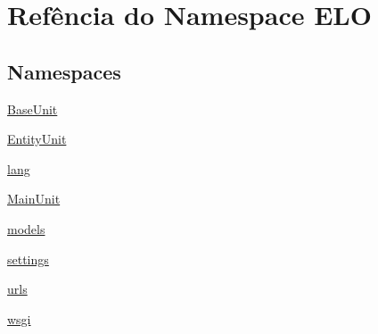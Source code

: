 \hypertarget{namespaceELO}{\section{Refência do Namespace E\-L\-O}
\label{namespaceELO}
}
\subsection*{Namespaces}
\begin{DoxyCompactItemize}
\item 
\hyperlink{namespaceELO_1_1BaseUnit}{Base\-Unit}
\item 
\hyperlink{namespaceELO_1_1EntityUnit}{Entity\-Unit}
\item 
\hyperlink{namespaceELO_1_1lang}{lang}
\item 
\hyperlink{namespaceELO_1_1MainUnit}{Main\-Unit}
\item 
\hyperlink{namespaceELO_1_1models}{models}
\item 
\hyperlink{namespaceELO_1_1settings}{settings}
\item 
\hyperlink{namespaceELO_1_1urls}{urls}
\item 
\hyperlink{namespaceELO_1_1wsgi}{wsgi}
\end{DoxyCompactItemize}
